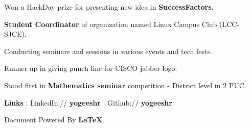 \documentclass[12pt,a4paper]{report}
\begin{document}
\begin{itemize}
\setlength{\itemsep}{2pt}
{\setlength\itemindent{25pt} \item {Won a HackDay prize for presenting new idea in \textbf{SuccessFactors}.}}
{\setlength\itemindent{25pt} \item { \textbf{Student Coordinator} of organization named Linux Campus Club (LCC-SJCE).}}
{\setlength\itemindent{25pt} \item { Conducting seminars and sessions in various events and tech fests.}}
{\setlength\itemindent{25pt} \item { Runner up in giving punch line for CISCO jabber logo.}}
{\setlength\itemindent{25pt} \item { Stood first in \textbf{Mathematics seminar} competition - District level in 2 PUC.}}
\end{itemize}

\vspace*{0.5cm}
\noindent\makebox[\linewidth]{\rule{\paperwidth}{0.4pt}}
\textbf{Links} : {LinkedIn:// \textbf{yogeeshr} | Github:// \textbf{yogeeshr}}

\noindent\makebox[\linewidth]{\rule{\paperwidth}{0.4pt}}

\flushright
\hfill {Document Powered By {\large{\textbf{\LaTeX}}}}
\flushleft
\end{document}
